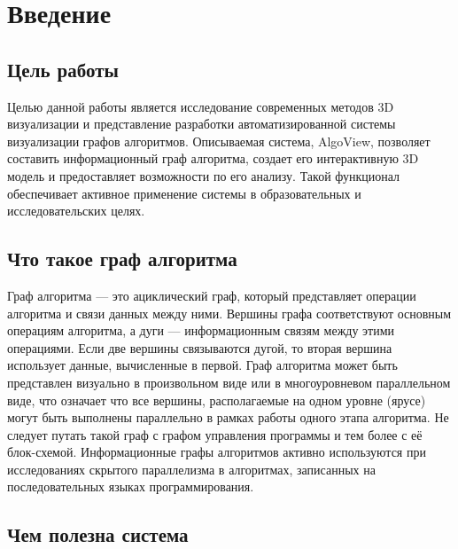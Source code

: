 \section{Введение}
\label{sec:Chapter0} 


\subsection{Цель работы} 

Целью данной работы является исследование современных методов 3D визуализации и представление разработки автоматизированной системы визуализации графов алгоритмов. Описываемая система, AlgoView, позволяет составить информационный граф алгоритма, создает его интерактивную 3D модель и предоставляет возможности по его анализу. Такой функционал обеспечивает активное применение системы в образовательных и исследовательских целях. \cite{AlgoWiki_main}

\subsection{Что такое граф алгоритма}
 
Граф алгоритма — это ациклический граф, который представляет операции алгоритма и связи данных между ними. Вершины графа соответствуют основным операциям алгоритма, а дуги — информационным связям между этими операциями. Если две вершины связываются дугой, то вторая вершина использует данные, вычисленные в первой. Граф алгоритма может быть представлен визуально в произвольном виде или в многоуровневом параллельном виде, что означает что все вершины, располагаемые на одном уровне (ярусе) могут быть выполнены параллельно в рамках работы одного этапа алгоритма. Не следует путать такой граф с графом управления программы и тем более с её блок-схемой. Информационные графы алгоритмов активно используются при исследованиях скрытого параллелизма в алгоритмах, записанных на  последовательных языках программирования. \cite{Voevodin_book}

\subsection{Чем полезна система}

